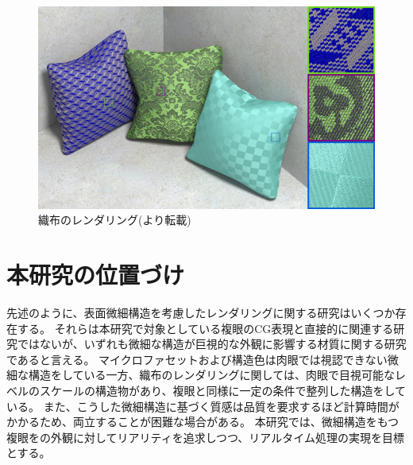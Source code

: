 \begin{figure}[htbp]
  \centering
  \includegraphics[width=5.5in]{./img/cussions.jpg}
  \caption{織布のレンダリング(\cite{zhao2012structure}より転載)}
  \label{FZhao3}
\end{figure}

\section{本研究の位置づけ}
\label{SPosition}

先述のように、表面微細構造を考慮したレンダリングに関する研究はいくつか存在する。
それらは本研究で対象としている複眼のCG表現と直接的に関連する研究ではないが、いずれも微細な構造が巨視的な外観に影響する材質に関する研究であると言える。
マイクロファセットおよび構造色は肉眼では視認できない微細な構造をしている一方、織布のレンダリングに関しては、肉眼で目視可能なレベルのスケールの構造物があり、複眼と同様に一定の条件で整列した構造をしている。
また、こうした微細構造に基づく質感は品質を要求するほど計算時間がかかるため、両立することが困難な場合がある。
本研究では、微細構造をもつ複眼をの外観に対してリアリティを追求しつつ、リアルタイム処理の実現を目標とする。


